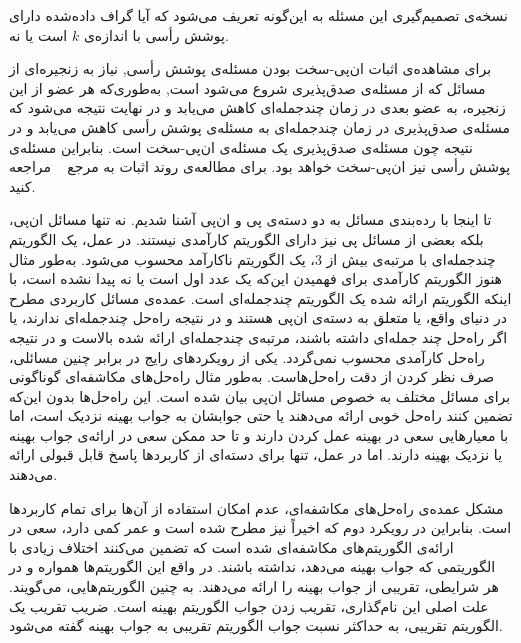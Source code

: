 نسخه‌ی تصمیم‌گیری این مسئله به این‌گونه تعریف می‌شود که آیا گراف داده‌شده دارای پوشش رأسی با اندازه‌ی $k$ است یا نه.



برای مشاهده‌ی اثبات ان‌پی-سخت بودن مسئله‌ی پوشش رأسی, نیاز به زنجیره‌ای از مسائل که از مسئله‌ی صدق‌پذیری شروع می‌شود است, به‌طوری‌که هر عضو از این زنجیره، به عضو بعدی در زمان چندجمله‌ای کاهش می‌یابد و در نهایت نتیجه می‌شود که مسئله‌ی صدق‌پذیری در زمان چندجمله‌ای به مسئله‌ی پوشش رأسی کاهش می‌یابد و در نتیجه چون مسئله‌ی صدق‌پذیری یک مسئله‌ی ان‌پی-سخت است.
بنابراین مسئله‌ی پوشش رأسی نیز ان‌پی-سخت خواهد بود. برای مطالعه‌ی روند اثبات به مرجع ~ مراجعه کنید. 



تا اینجا با رده‌بندی مسائل به دو دسته‌ی پی و ان‌پی آشنا شدیم.
نه تنها مسائل ان‌پی، بلکه بعضی از مسائل پی نیز دارای الگوریتم کارآمدی نیستند.
در عمل، یک الگوریتم چندجمله‌ای با مرتبه‌ی بیش از $3$، یک الگوریتم ناکارآمد محسوب می‌شود.
به‌طور مثال هنوز الگوریتم کارآمدی برای فهمیدن این‌که یک عدد اول است یا نه پیدا نشده است، با اینکه الگوریتم ارائه شده یک الگوریتم چندجمله‌ای است.
عمده‌ی مسائل کاربردی مطرح در دنیای واقع، یا متعلق به دسته‌ی ان‌پی هستند و در نتیجه راه‌حل چندجمله‌ای ندارند، یا اگر راه‌حل چند جمله‌ای داشته باشند، مرتبه‌ی چندجمله‌ای ارائه شده بالاست و در نتیجه راه‌حل کارآمدی محسوب نمی‌گردد.
یکی از رویکردهای رایج در برابر چنین مسائلی، صرف نظر کردن از دقت راه‌حل‌هاست.
به‌طور مثال راه‌حل‌های مکاشفه‌ای گوناگونی برای مسائل مختلف به خصوص مسائل ان‌پی بیان شده است.
این راه‌حل‌ها بدون این‌که تضمین کنند راه‌حل خوبی ارائه می‌دهند یا حتی جوابشان به جواب بهینه نزدیک است، اما با معیارهایی سعی در بهینه عمل کردن دارند و تا حد ممکن سعی در ارائه‌ی جواب بهینه یا نزدیک بهینه دارند.
اما در عمل، تنها برای دسته‌ای از کاربردها پاسخ قابل قبولی ارائه می‌دهند. 

مشکل عمده‌ی راه‌حل‌های مکاشفه‌ای، عدم امکان استفاده از آن‌ها برای تمام کاربردها است.
بنابراین در رویکرد دوم که اخیراً نیز مطرح شده است و عمر کمی دارد، سعی در ارائه‌ی الگوریتم‌های مکاشفه‌ای شده است که تضمین می‌کنند اختلاف زیادی با الگوریتمی که جواب بهینه می‌دهد، نداشته باشند.
در واقع این الگوریتم‌ها همواره و در هر شرایطی، تقریبی از جواب بهینه را ارائه می‌دهند.
به چنین الگوریتم‌هایی،  می‌گویند.
علت اصلی این نام‌گذاری، تقریب زدن جواب الگوریتم بهینه است.
ضریب تقریب یک الگوریتم تقریبی، به حداکثر نسبت جواب الگوریتم تقریبی به جواب بهینه گفته می‌شود.


